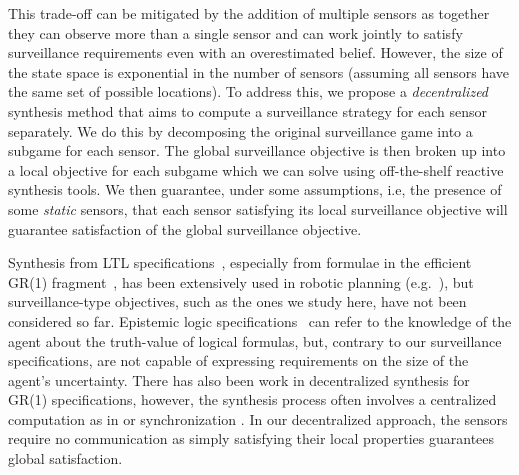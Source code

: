 This trade-off can be mitigated by the addition of multiple sensors as together they can observe more than a single sensor and can work jointly to satisfy surveillance requirements even with an overestimated belief. However, the size of the state space is exponential in the number of sensors (assuming all sensors have the same set of possible locations). To address this, we propose a \emph{decentralized} synthesis method that aims to compute a surveillance strategy for each sensor separately. We do this by decomposing the original surveillance game into a subgame for each sensor. The global surveillance objective is then broken up into a local objective for each subgame which we can solve using off-the-shelf reactive synthesis tools. We then guarantee, under some assumptions, i.e, the presence of some \emph{static} sensors, that each sensor satisfying its local surveillance objective will guarantee satisfaction of the global surveillance objective.

Synthesis from LTL specifications~\cite{Pnueli1989}, especially from formulae in the efficient GR(1) fragment~\cite{Piterman2006}, has been extensively used in robotic planning (e.g.~\cite{wong2012,Kress2007}), but surveillance-type objectives, such as the ones we study here, have not been considered so far. Epistemic logic specifications~\cite{MeydenV98} can refer to the knowledge of the agent about the truth-value of logical formulas, but, contrary to our surveillance specifications, are not capable of expressing requirements on the size of the agent's uncertainty. There has also been work in decentralized synthesis for GR(1) specifications, however, the synthesis process often involves a centralized computation as in \cite{Kloetzer06} or synchronization \cite{Salar17,Kloetzer11}. In our decentralized approach, the sensors require no communication as simply satisfying their local properties guarantees global satisfaction.



